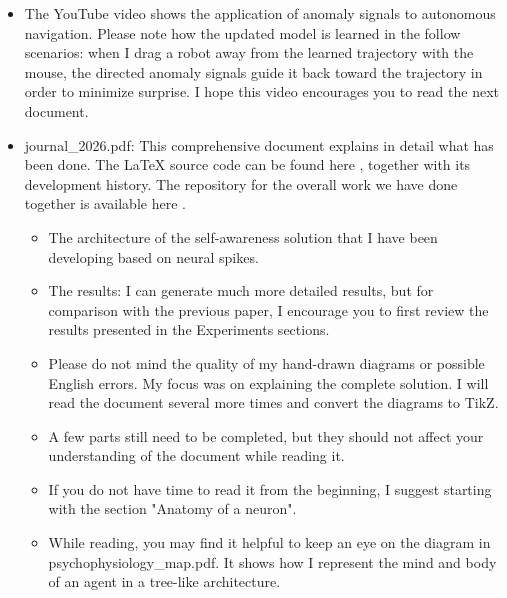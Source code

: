 \documentclass[a4paper]{article}
\begin{document}
      \begin{itemize}
         \item The YouTube video shows the application of anomaly signals to autonomous navigation. Please note how the updated model is learned in the follow scenarios: when I drag a robot away from the learned trajectory with the mouse, the directed anomaly signals guide it back toward the trajectory in order to minimize surprise. I hope this video encourages you to read the next document. 
         \item journal\_2026.pdf: This comprehensive document explains in detail what has been done. The LaTeX source code can be found here , together with its development history. The repository for the overall work we have done together is available here .
        
         \begin{itemize}
            \item The architecture of the self-awareness solution that I have been developing based on neural spikes.
            \item The results: I can generate much more detailed results, but for comparison with the previous paper, I encourage you to first review the results presented in the Experiments sections.
            \item Please do not mind the quality of my hand-drawn diagrams or possible English errors. My focus was on explaining the complete solution. I will read the document several more times and convert the diagrams to TikZ.
            \item A few parts still need to be completed, but they should not affect your understanding of the document while reading it.
            \item If you do not have time to read it from the beginning, I suggest starting with the section "Anatomy of a neuron".
            \item While reading, you may find it helpful to keep an eye on the diagram in psychophysiology\_map.pdf. It shows how I represent the mind and body of an agent in a tree-like architecture.


\end{itemize}
\end{itemize}
\end{document}
